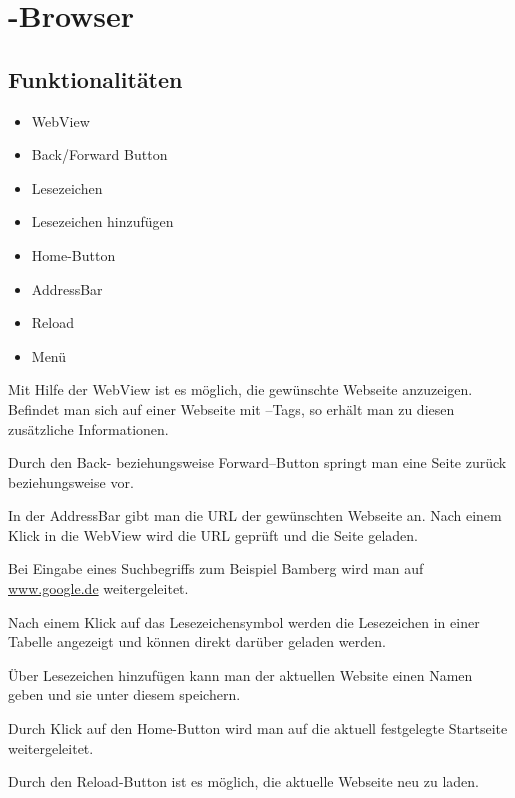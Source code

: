 \chapter{\SECH-Browser}

\section{Funktionalitäten}

\begin{itemize}
	\item WebView
	\item Back/Forward Button
	\item Lesezeichen
	\item Lesezeichen hinzufügen
	\item Home-Button
	\item AddressBar
	\item Reload
	\item Menü
\end{itemize}

Mit Hilfe der WebView ist es möglich, die gewünschte Webseite
anzuzeigen. Befindet man sich auf einer Webseite mit \SEARCH--Tags, so
erhält man zu diesen zusätzliche Informationen.

Durch den Back- beziehungsweise Forward--Button springt man eine Seite
zurück beziehungsweise vor.

In der AddressBar gibt man die URL der gewünschten Webseite an. Nach
einem Klick in die WebView wird die URL geprüft und die Seite geladen.

Bei Eingabe eines Suchbegriffs zum Beispiel Bamberg wird man auf
\url{www.google.de} weitergeleitet.

Nach einem Klick auf das Lesezeichensymbol werden die Lesezeichen in einer
Tabelle angezeigt und können direkt darüber geladen werden.

Über Lesezeichen hinzufügen kann man der aktuellen Website einen Namen geben
und sie unter diesem speichern.

Durch Klick auf den Home-Button wird man auf die aktuell festgelegte
Startseite weitergeleitet.

Durch den Reload-Button ist es möglich, die aktuelle Webseite neu zu laden.